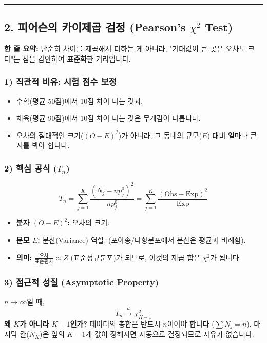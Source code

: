 \documentclass[11pt,a4paper]{book}
\theoremstyle{definition}
\begin{document}
\vspace{0.5cm}\hrule\vspace{0.5cm}

\subsection{2. 피어슨의 카이제곱 검정 (Pearson's $\chi^2$ Test)}

\begin{conceptbox}[title={개념 2: 현실(Observed)과 이론(Expected)의 거리}]
\textbf{한 줄 요약:} 단순히 차이를 제곱해서 더하는 게 아니라, "기대값이 큰 곳은 오차도 크다"는 점을 감안하여 \textbf{표준화}한 거리입니다.
\end{conceptbox}

\subsubsection*{1) 직관적 비유: 시험 점수 보정}
\begin{itemize}
    \item 수학(평균 50점)에서 10점 차이 나는 것과,
    \item 체육(평균 90점)에서 10점 차이 나는 것은 무게감이 다릅니다.
    \item 오차의 절대적인 크기($(O-E)^2$)가 아니라, 그 동네의 규모($E$) 대비 얼마나 큰지를 봐야 합니다.
\end{itemize}

\subsubsection*{2) 핵심 공식 ($T_n$)}
$$ T_n = \sum_{j=1}^K \frac{(N_j - n p_j^0)^2}{n p_j^0} = \sum_{j=1}^K \frac{(\text{Obs} - \text{Exp})^2}{\text{Exp}} $$
\begin{itemize}
    \item \textbf{분자 $(O-E)^2$:} 오차의 크기.
    \item \textbf{분모 $E$:} 분산(Variance) 역할. (포아송/다항분포에서 분산은 평균과 비례함).
    \item \textbf{의미:} $\frac{\text{오차}}{\text{표준편차}} \approx Z$ (표준정규분포)가 되므로, 이것의 제곱 합은 $\chi^2$가 됩니다.
\end{itemize}


\subsubsection*{3) 점근적 성질 (Asymptotic Property)}
$n \to \infty$일 때,
$$ T_n \xrightarrow{d} \chi^2_{K-1} $$
\textbf{왜 $K$가 아니라 $K-1$인가?}
데이터의 총합은 반드시 $n$이어야 합니다 ($\sum N_j = n$). 마지막 칸($N_K$)은 앞의 $K-1$개 값이 정해지면 자동으로 결정되므로 자유가 없습니다.
\end{document}

